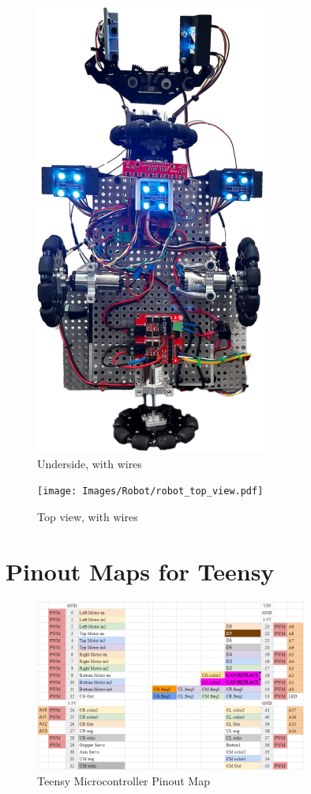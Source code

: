 \documentclass[12pt]{report}
\begin{document}
\begin{figure}[H]
    \centering
    \includegraphics[width=0.68\textwidth]{Images/Robot/robot_underside.pdf}
    \caption{Underside, with wires}
    \label{fig:underside}
\end{figure}



\begin{figure}[H]
    \centering
    \texttt{[image: Images/Robot/robot\_top\_view.pdf]}
    \caption{Top view, with wires}
    \label{fig:topview}
\end{figure}
\section{Pinout Maps for Teensy}
\begin{figure}[H]
    \centering
    \includegraphics[width=0.8\textwidth]{Images/PinoutMap/Pinout map.PNG}
    \caption{Teensy Microcontroller Pinout Map}
    \label{fig:Pinoutmap}
\end{figure}
\end{document}
